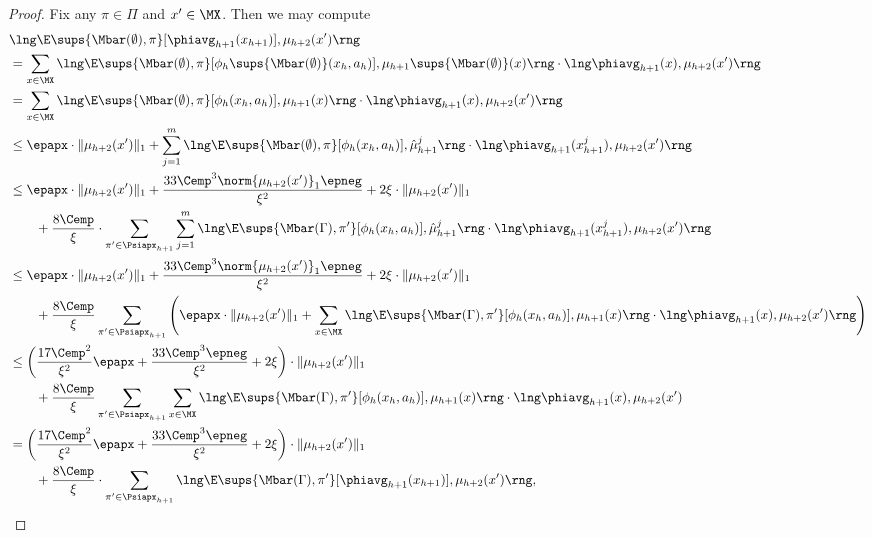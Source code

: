 \documentclass[11pt, oneside]{article}
\theoremstyle{plain}
\theoremstyle{definition}
\numberwithin{theorem}{section}
\renewcommand{\^}[1]{^{(#1)}}
\begin{document}
\begin{proof}
  Fix any $\pi \in \Pi$ and $x' \in \MX$. Then we may compute
  \begin{align}
    & \lng \E\sups{\Mbar(\emptyset), \pi}[\phiavg_{h+1}(x_{h+1})], \mu_{h+2}(x') \rng \nonumber\\
    &= \sum_{x \in \MX} \lng \E\sups{\Mbar(\emptyset), \pi}[ \phi_h\sups{\Mbar(\emptyset)}(x_h, a_h)], \mu_{h+1}\sups{\Mbar(\emptyset)}(x) \rng \cdot \lng \phiavg_{h+1}(x), \mu_{h+2}(x') \rng \nonumber\\
    &= \sum_{x \in \MX} \lng \E\sups{\Mbar(\emptyset), \pi}[ \phi_h(x_h, a_h)], \mu_{h+1}(x) \rng \cdot \lng \phiavg_{h+1}(x), \mu_{h+2}(x') \rng \nonumber\\
    &\leq  \epapx \cdot \| \mu_{h+2}(x') \|_1 + \sum_{j=1}^m \lng \E\sups{\Mbar(\emptyset),\pi}[\phi_h(x_h, a_h)], \hat \mu_{h+1}^j \rng \cdot \lng  \phiavg_{h+1}(x_{h+1}^j), \mu_{h+2}(x') \rng \nonumber\\
    &\leq  \epapx \cdot \| \mu_{h+2}(x') \|_1 + \frac{33\Cemp^3 \norm{\mu_{h+2}(x')}_1 \epneg}{\xi^2} + 2\xi \cdot \| \mu_{h+2}(x') \|_1 \nonumber\\
    &\qquad+ \frac{8\Cemp}{\xi} \cdot  \sum_{\pi' \in \Psiapx_{h+1}} \sum_{j=1}^m  \lng \E\sups{\Mbar(\Gamma),\pi'}[\phi_h(x_h, a_h)], \hat \mu_{h+1}^j \rng \cdot \lng  \phiavg_{h+1}(x_{h+1}^j), \mu_{h+2}(x') \rng \nonumber\\
    &\leq \epapx \cdot \| \mu_{h+2}(x') \|_1 + \frac{33\Cemp^3 \norm{\mu_{h+2}(x')}_1 \epneg}{\xi^2} + {2}\xi \cdot \| \mu_{h+2}(x') \|_1 \nonumber\\
    &\qquad + \frac{8\Cemp}{\xi} \sum_{\pi' \in \Psiapx_{h+1}} \left( \epapx \cdot \| \mu_{h+2}(x') \|_1 + \sum_{x \in \MX} \lng \E\sups{\Mbar(\Gamma),\pi'}[\phi_h(x_h, a_h)], \mu_{h+1}(x) \rng \cdot \lng \phiavg_{h+1}(x), \mu_{h+2}(x') \rng\right)\nonumber\\
    &\leq \left( \frac{17\Cemp^2}{\xi^2}\epapx+ \frac{33\Cemp^3 \epneg}{\xi^2} + 2\xi \right) \cdot \| \mu_{h+2}(x') \|_1 \nonumber\\
    &\qquad+ \frac{8\Cemp}{\xi} \sum_{\pi' \in \Psiapx_{h+1}} \sum_{x \in \MX} \lng \E\sups{\Mbar(\Gamma),\pi'}[\phi_h(x_h, a_h)], \mu_{h+1}(x) \rng \cdot \lng \phiavg_{h+1}(x), \mu_{h+2}(x') \nonumber \\
    &= \left( \frac{17\Cemp^2}{\xi^2}\epapx+ \frac{33\Cemp^3 \epneg}{\xi^2} + 2\xi \right) \cdot \| \mu_{h+2}(x') \|_1 \nonumber\\
    &\qquad+  \frac{8\Cemp}{\xi} \cdot \sum_{\pi' \in \Psiapx_{h+1}} \lng \E\sups{\Mbar(\Gamma),\pi'}[\phiavg_{h+1}(x_{h+1})], \mu_{h+2}(x') \rng \label{eq:vis-bound-1},

\end{align}
\end{proof}
\end{document}
